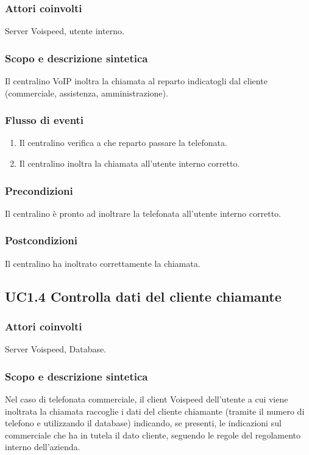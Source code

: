 \subsubsection*{Attori coinvolti} Server Voispeed, utente interno.
\subsubsection*{Scopo e descrizione sintetica}
Il centralino VoIP  inoltra la chiamata al reparto indicatogli dal cliente (commerciale, assistenza, amministrazione).
\subsubsection*{Flusso di eventi}
\begin{enumerate}
\item Il centralino verifica a che reparto passare la telefonata.
\item Il centralino inoltra la chiamata all'utente interno corretto.
\end{enumerate}
\subsubsection*{Precondizioni} Il centralino \` e pronto ad inoltrare la telefonata all'utente interno corretto.
\subsubsection*{Postcondizioni} Il centralino ha inoltrato correttamente la chiamata.

\subsection*{UC1.4 Controlla dati del cliente chiamante}
\subsubsection*{Attori coinvolti} Server Voispeed, Database.
\subsubsection*{Scopo e descrizione sintetica}
Nel caso di telefonata commerciale, il client Voispeed dell'utente a cui viene inoltrata la chiamata raccoglie i dati del cliente chiamante (tramite il numero di telefono e utilizzando il database) indicando, se presenti, le indicazioni sul commerciale che ha in tutela il dato cliente, seguendo le regole del regolamento interno dell'azienda.

